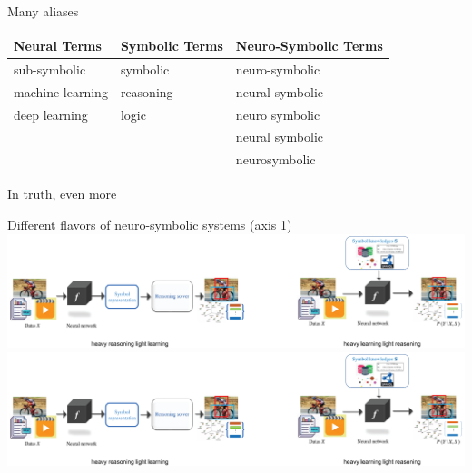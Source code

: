 \documentclass{lecture}
\begin{document}
\begin{frame}{Many aliases}
    \centering
    \begin{tabular}{lll}
        
        Neural Terms & Symbolic Terms & Neuro-Symbolic Terms\\
        \hline
        sub-symbolic & symbolic & neuro-symbolic\\
        machine learning & reasoning & neural-symbolic \\
        deep learning & logic & neuro symbolic \\
         & & neural symbolic \\
         & & neurosymbolic \\
        
        \end{tabular}
        \pause

        \vspace{2cm}
        \alert{In truth, even more}
\end{frame}

\begin{frame}{Different flavors of neuro-symbolic systems (axis 1)}
    \centering\includegraphics[width=.8\textwidth,clip,trim=0 0 18cm 3cm]{SW223228/yu-et-al.eps}\\
    \centering\includegraphics[width=.6\textwidth,clip,trim=23cm 0 0 0]{SW223228/yu-et-al.eps}
\end{frame}
\end{document}
